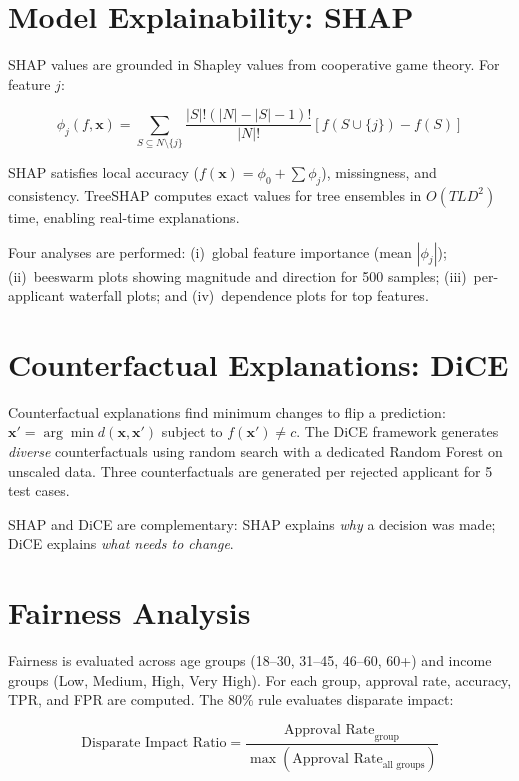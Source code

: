 \documentclass[12pt]{report}
\begin{document}
\section{Model Explainability: SHAP}

SHAP values are grounded in Shapley values from cooperative game theory. For feature $j$:

\begin{equation}
\phi_j(f, \mathbf{x}) = \sum_{S \subseteq N \setminus \{j\}} \frac{|S|!(|N|{-}|S|{-}1)!}{|N|!} [f(S \cup \{j\}) - f(S)]
\end{equation}

SHAP satisfies local accuracy ($f(\mathbf{x}) = \phi_0 + \sum \phi_j$), missingness, and consistency. TreeSHAP computes exact values for tree ensembles in $O(TLD^2)$ time, enabling real-time explanations.

Four analyses are performed: (i)~global feature importance (mean $|\phi_j|$); (ii)~beeswarm plots showing magnitude and direction for 500 samples; (iii)~per-applicant waterfall plots; and (iv)~dependence plots for top features.


\section{Counterfactual Explanations: DiCE}

Counterfactual explanations find minimum changes to flip a prediction: $\mathbf{x}' = \arg\min d(\mathbf{x}, \mathbf{x}')$ subject to $f(\mathbf{x}') \neq c$. The DiCE framework generates \textit{diverse} counterfactuals using random search with a dedicated Random Forest on unscaled data. Three counterfactuals are generated per rejected applicant for 5 test cases.

SHAP and DiCE are complementary: SHAP explains \textit{why} a decision was made; DiCE explains \textit{what needs to change}.


\section{Fairness Analysis}

Fairness is evaluated across age groups (18--30, 31--45, 46--60, 60+) and income groups (Low, Medium, High, Very High). For each group, approval rate, accuracy, TPR, and FPR are computed. The 80\% rule evaluates disparate impact:

\begin{equation}
\text{Disparate Impact Ratio} = \frac{\text{Approval Rate}_{\text{group}}}{\max(\text{Approval Rate}_{\text{all groups}})}
\end{equation}
\end{document}
